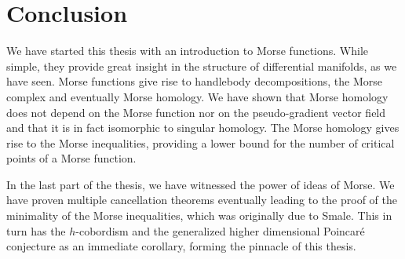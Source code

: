 \chapter*{Conclusion}
\label{ch:conclusion}

We have started this thesis with an introduction to Morse functions.
While simple, they provide great insight in the structure of differential manifolds, as we have seen.
Morse functions give rise to handlebody decompositions, the Morse complex and eventually Morse homology.
We have shown that Morse homology does not depend on the Morse function nor on the pseudo-gradient vector field and that it is in fact isomorphic to singular homology.
The Morse homology gives rise to the Morse inequalities, providing a lower bound for the number of critical points of a Morse function.

In the last part of the thesis, we have witnessed the power of ideas of Morse.
We have proven multiple cancellation theorems eventually leading to the proof of the minimality of the Morse inequalities, which was originally due to Smale.
This in turn has the $h$-cobordism and the generalized higher dimensional Poincaré conjecture as an immediate corollary, forming the pinnacle of this thesis.
